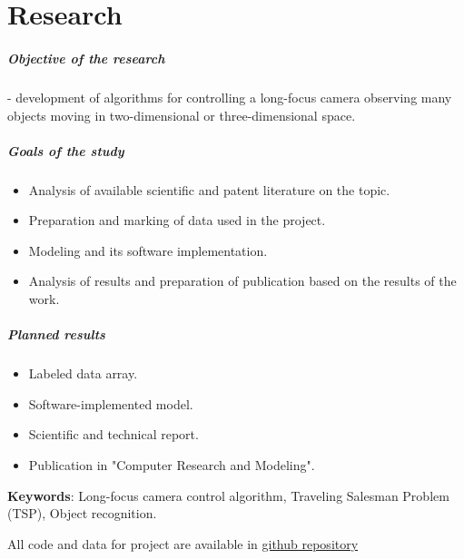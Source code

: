 \chapter*{Research}

\paragraph{Objective of the research} - development of algorithms for controlling a long-focus camera observing many objects moving in two-dimensional or three-dimensional space.


\paragraph{Goals of the study} 

\begin{itemize}
    \item Analysis of available scientific and patent literature on the topic.
    \item Preparation and marking of data used in the project.
    \item Modeling and its software implementation.
    \item Analysis of results and preparation of publication based on the results of the work.
\end{itemize}


\paragraph{Planned results} 
\begin{itemize}
    \item Labeled data array.
    \item Software-implemented model.
    \item Scientific and technical report.
    \item Publication in "Computer Research and Modeling".
    
\end{itemize}

\textbf{Keywords}: Long-focus camera control algorithm, Traveling Salesman Problem (TSP), Object recognition.
\vspace{2cm}

All code and data for project are available in \href{https://github.com/mikecarti/hse-cam2023}{github repository}
